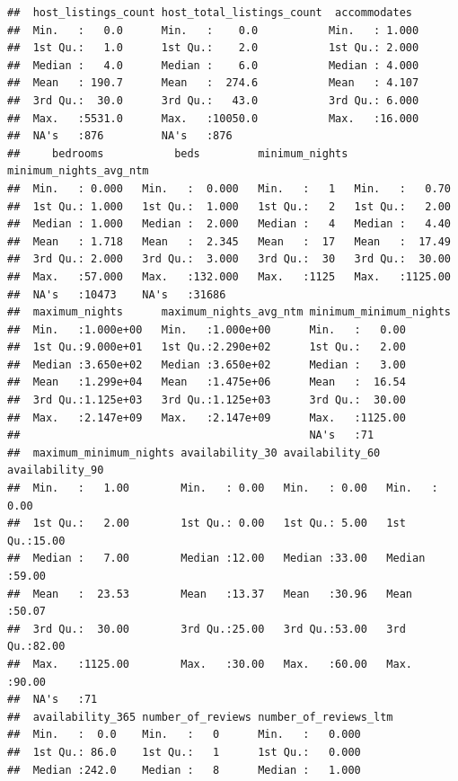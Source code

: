 \documentclass[
]{article}
\begin{document}
\begin{verbatim}
##  host_listings_count host_total_listings_count  accommodates   
##  Min.   :   0.0      Min.   :    0.0           Min.   : 1.000  
##  1st Qu.:   1.0      1st Qu.:    2.0           1st Qu.: 2.000  
##  Median :   4.0      Median :    6.0           Median : 4.000  
##  Mean   : 190.7      Mean   :  274.6           Mean   : 4.107  
##  3rd Qu.:  30.0      3rd Qu.:   43.0           3rd Qu.: 6.000  
##  Max.   :5531.0      Max.   :10050.0           Max.   :16.000  
##  NA's   :876         NA's   :876                               
##     bedrooms           beds         minimum_nights minimum_nights_avg_ntm
##  Min.   : 0.000   Min.   :  0.000   Min.   :   1   Min.   :   0.70       
##  1st Qu.: 1.000   1st Qu.:  1.000   1st Qu.:   2   1st Qu.:   2.00       
##  Median : 1.000   Median :  2.000   Median :   4   Median :   4.40       
##  Mean   : 1.718   Mean   :  2.345   Mean   :  17   Mean   :  17.49       
##  3rd Qu.: 2.000   3rd Qu.:  3.000   3rd Qu.:  30   3rd Qu.:  30.00       
##  Max.   :57.000   Max.   :132.000   Max.   :1125   Max.   :1125.00       
##  NA's   :10473    NA's   :31686                                          
##  maximum_nights      maximum_nights_avg_ntm minimum_minimum_nights
##  Min.   :1.000e+00   Min.   :1.000e+00      Min.   :   0.00       
##  1st Qu.:9.000e+01   1st Qu.:2.290e+02      1st Qu.:   2.00       
##  Median :3.650e+02   Median :3.650e+02      Median :   3.00       
##  Mean   :1.299e+04   Mean   :1.475e+06      Mean   :  16.54       
##  3rd Qu.:1.125e+03   3rd Qu.:1.125e+03      3rd Qu.:  30.00       
##  Max.   :2.147e+09   Max.   :2.147e+09      Max.   :1125.00       
##                                             NA's   :71            
##  maximum_minimum_nights availability_30 availability_60 availability_90
##  Min.   :   1.00        Min.   : 0.00   Min.   : 0.00   Min.   : 0.00  
##  1st Qu.:   2.00        1st Qu.: 0.00   1st Qu.: 5.00   1st Qu.:15.00  
##  Median :   7.00        Median :12.00   Median :33.00   Median :59.00  
##  Mean   :  23.53        Mean   :13.37   Mean   :30.96   Mean   :50.07  
##  3rd Qu.:  30.00        3rd Qu.:25.00   3rd Qu.:53.00   3rd Qu.:82.00  
##  Max.   :1125.00        Max.   :30.00   Max.   :60.00   Max.   :90.00  
##  NA's   :71                                                            
##  availability_365 number_of_reviews number_of_reviews_ltm
##  Min.   :  0.0    Min.   :   0      Min.   :   0.000     
##  1st Qu.: 86.0    1st Qu.:   1      1st Qu.:   0.000     
##  Median :242.0    Median :   8      Median :   1.000     

\end{verbatim}
\end{document}
